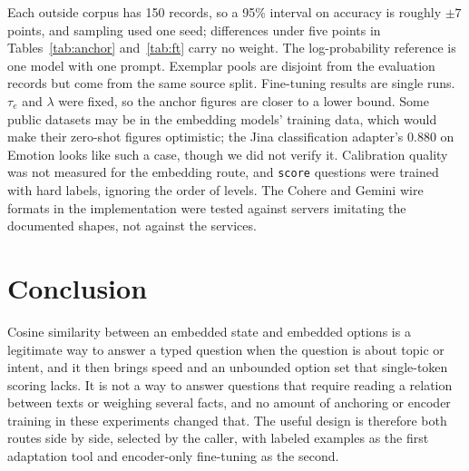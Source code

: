 \documentclass[11pt]{article}
\begin{document}
Each outside corpus has 150 records, so a 95\% interval on accuracy is roughly
$\pm 7$ points, and sampling used one seed; differences under five points in
Tables~\ref{tab:anchor} and~\ref{tab:ft} carry no weight. The log-probability
reference is one model with one prompt. Exemplar pools are disjoint from the
evaluation records but come from the same source split. Fine-tuning results
are single runs. $\tau_e$ and $\lambda$ were fixed, so the anchor figures are
closer to a lower bound. Some public datasets may be in the embedding models'
training data, which would make their zero-shot figures optimistic; the Jina
classification adapter's 0.880 on Emotion looks like such a case, though we
did not verify it. Calibration quality was not measured for the embedding
route, and \texttt{score} questions were trained with hard labels, ignoring
the order of levels. The Cohere and Gemini wire formats in the implementation
were tested against servers imitating the documented shapes, not against the
services.

\section{Conclusion}

Cosine similarity between an embedded state and embedded options is a
legitimate way to answer a typed question when the question is about topic or
intent, and it then brings speed and an unbounded option set that single-token
scoring lacks. It is not a way to answer questions that require reading a
relation between texts or weighing several facts, and no amount of anchoring
or encoder training in these experiments changed that. The useful design is
therefore both routes side by side, selected by the caller, with labeled
examples as the first adaptation tool and encoder-only fine-tuning as the
second.
\end{document}
